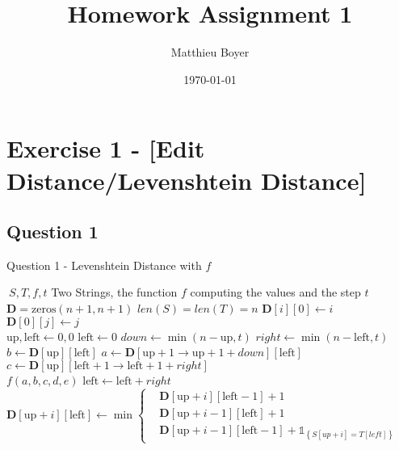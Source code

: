 \documentclass{cours}
\title{Homework Assignment 1}
\author{Matthieu Boyer}
\date{\today}
\begin{document}
\section{Exercise 1 - [Edit Distance/Levenshtein Distance]}
\subsection{Question 1}
\begin{algorithm}
    \caption{Question 1 - Levenshtein Distance with $f$}
    \begin{algorithmic}
        \Input $\ S, T, f, t$ \Comment Two Strings, the function $f$ computing the values and the step $t$
        \EndInput\\
        \State $\mathbf{D} = \text{zeros}(n + 1, n + 1)$ \Comment $len(S) = len(T) = n$
            \State $\mathbf{D}[i][0] \gets i$
        \EndFor\\
            \State $\mathbf{D}[0][j] \gets j$
        \EndFor\\
        \State $\text{up}, \text{left} \gets 0, 0$
            \State $\text{left} \gets 0$
                \State $down \gets \min(n-\text{up}, t)$
                \State $right \gets \min(n-\text{left}, t)$\\
                \State $b \gets \mathbf{D}[\text{up}][\text{left}]$
                \State $a \gets \mathbf{D}[\text{up} + 1 \rightarrow \text{up} + 1 + down][\text{left}]$
                \State $c \gets \mathbf{D}[\text{up}][\text{left} + 1 \rightarrow \text{left} + 1 + right]$\\
                \State $f(a, b, c, d, e)$ 
                \State $\text{left} \gets \text{left} + right$
                    \State $\mathbf{D}[\text{up} + i][\text{left}] \gets \min{\begin{cases} &\mathbf{D}[\text{up} + i][\text{left} - 1] + 1 \\ &\mathbf{D}[\text{up} + i - 1][\text{left}] + 1\\ &\mathbf{D}[\text{up} + i - 1][\text{left} - 1] + \mathds{1}_{\left\{S[up + i] = T[left]\right\}} \end{cases}}$ \\ 

\end{algorithmic}
\end{algorithm}
\end{document}
